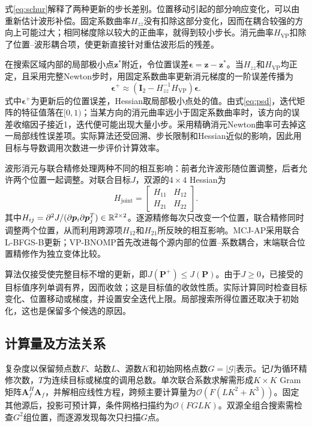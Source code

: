 式\eqref{eq:schur}解释了两种更新的步长差别。位置移动引起的部分响应变化，可以由重新估计波形补偿。固定系数曲率$H_{zz}$没有扣除这部分变化，因而在耦合较强的方向上可能过大；相同梯度除以较大的正曲率，就得到较小步长。消元曲率$H_{\mathrm{VP}}$扣除了位置--波形耦合项，使更新直接针对重估波形后的残差。

在搜索区域内部的局部极小点$\bm z^*$附近，令位置误差$\bm\epsilon=\bm z-\bm z^*$。当$H_{zz}$和$H_{\mathrm{VP}}$均正定，且采用完整Newton步时，用固定系数曲率更新消元梯度的一阶误差传播为
\begin{equation}
 \bm\epsilon^{+}\approx
 \left(\bm I_2-H_{zz}^{-1}H_{\mathrm{VP}}\right)\bm\epsilon .\label{eq:localrate}
\end{equation}
式中$\bm\epsilon^+$为更新后的位置误差，Hessian取局部极小点处的值。由式\eqref{eq:psd}，迭代矩阵的特征值落在$[0,1)$；当某方向的消元曲率远小于固定系数曲率时，该方向的误差收缩因子接近1，迭代便可能出现大量小步。采用精确消元Newton曲率可去掉这一局部线性误差项。实际算法还受回溯、步长限制和Hessian近似的影响，因此用目标与导数调用次数进一步评价计算效率。

波形消元与联合精修处理两种不同的相互影响：前者允许波形随位置调整，后者允许两个位置一起调整。对联合目标$J$，双源的$4\times4$ Hessian为
\begin{equation}
 H_{\mathrm{joint}}=
 \begin{bmatrix}H_{11}&H_{12}\\H_{21}&H_{22}\end{bmatrix} .
\end{equation}
其中$H_{ij}=\partial^2J/(\partial\bm p_i\partial\bm p_j^T)\in\mathbb R^{2\times2}$。逐源精修每次只改变一个位置，联合精修同时调整两个位置，从而利用跨源项$H_{12}$和$H_{21}$所反映的相互影响。MCJ-AP采用联合L-BFGS-B更新；VP-BNOMP首先改进每个源内部的位置--系数耦合，末端联合位置精修作为独立变体比较。

算法仅接受使完整目标不增的更新，即$J(\bm P^+)\le J(\bm P)$。由于$J\ge0$，已接受的目标值序列单调有界，因而收敛；这是目标值的收敛性质。实际计算同时检查目标变化、位置移动或梯度，并设置安全迭代上限。局部搜索所得位置还取决于初始化，这也是保留多个候选的原因。

\subsection{计算量及方法关系}\label{sec:complexity}
复杂度以保留频点数$F$、站数$L$、源数$K$和初始网格点数$G=|\mathcal G|$表示。记$I$为循环精修次数，$T$为连续目标或梯度的调用总数。单次联合系数求解需形成$K\times K$ Gram矩阵$\bm A_f^H\bm A_f$，并解相应线性方程，跨频主要计算量为$\mathcal O(F(LK^2+K^3))$。固定其他源后，投影可预计算，条件网格扫描约为$\mathcal O(FGLK)$。双源全组合搜索需检查$G^2$组位置，而逐源发现每次只扫描$G$点。

